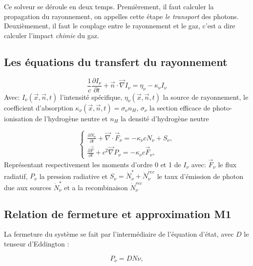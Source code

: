 Ce solveur se déroule en deux temps.
Premièrement, il faut calculer la propagation du rayonnement, on appelles cette étape \textit{le transport} des photons.
Deuxièmement, il faut le couplage entre le rayonnement et le gaz, c'est a dire calculer l'impact \textit{chimie} du gaz.


\subsection{Les équations du transfert du rayonnement}
\begin{equation}
\frac{1}{c} \frac{\partial I_\nu}{\partial t} + \vec{n}\cdot \vec{\nabla} I_\nu = \eta_\nu - \kappa_\nu I_\nu 
\end{equation}
Avec: $I_\nu(\vec{x},\vec{n},t)$ l'intensité spécifique,
$\eta_\nu(\vec{x},\vec{n},t)$ la source de rayonnement,
le coefficient d'absorption $\kappa_\nu(\vec{x},\vec{n},t) = \sigma_\nu n_H$, 
$\sigma_\nu$ la section efficace de photo-ionisation de l'hydrogène neutre et $n_H$ la densité d'hydrogène neutre


\begin{equation}
\begin{cases}

\frac{ \partial N_\nu }{ \partial t } + \vec{\nabla} \cdot \vec{F}_\nu = -\kappa_\nu c  N_\nu + S_\nu,\\

\frac{ \partial \vec{F} }{ \partial t } + c^2 \vec{\nabla} P_\nu = -\kappa_\nu c \vec{F}_\nu ,

\end{cases}
\label{eq:densite_energie}
\end{equation}
Représentant respectivement les moments d'ordre 0 et 1 de $I_\nu$ avec:
$\vec{F}_\nu$ le flux radiatif, 
$P_\nu $ la pression radiative
et $S_\nu = \dot{N}_\nu^* + \dot{N}_\nu^{rec}$ le taux d’émission de photon due aux sources $\dot{N}_\nu^*$ et a la recombinaison $ \dot{N}_\nu^{rec}$


\subsection{Relation de fermeture et approximation M1}
La fermeture du système se fait par l’intermédiaire de l’équation d’état, avec $D$ le tenseur d’Eddington :

\begin{equation}
 P_\nu = D N\nu ,
\label{eq:fermeture}
\end{equation}

